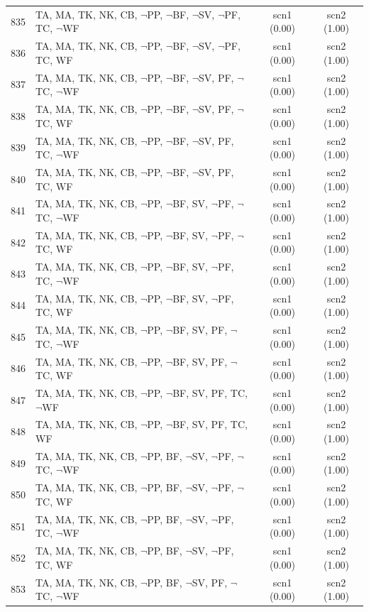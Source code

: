 \documentclass[12pt]{article}
\begin{document}
\begin{longtable}{|l|l|c|c|}
835 & TA, MA, TK, NK, CB, $\neg$PP, $\neg$BF, $\neg$SV, $\neg$PF, TC, $\neg$WF & scn1 (0.00) & scn2 (1.00)\\
836 & TA, MA, TK, NK, CB, $\neg$PP, $\neg$BF, $\neg$SV, $\neg$PF, TC, WF & scn1 (0.00) & scn2 (1.00)\\
837 & TA, MA, TK, NK, CB, $\neg$PP, $\neg$BF, $\neg$SV, PF, $\neg$TC, $\neg$WF & scn1 (0.00) & scn2 (1.00)\\
838 & TA, MA, TK, NK, CB, $\neg$PP, $\neg$BF, $\neg$SV, PF, $\neg$TC, WF & scn1 (0.00) & scn2 (1.00)\\
839 & TA, MA, TK, NK, CB, $\neg$PP, $\neg$BF, $\neg$SV, PF, TC, $\neg$WF & scn1 (0.00) & scn2 (1.00)\\
840 & TA, MA, TK, NK, CB, $\neg$PP, $\neg$BF, $\neg$SV, PF, TC, WF & scn1 (0.00) & scn2 (1.00)\\
841 & TA, MA, TK, NK, CB, $\neg$PP, $\neg$BF, SV, $\neg$PF, $\neg$TC, $\neg$WF & scn1 (0.00) & scn2 (1.00)\\
842 & TA, MA, TK, NK, CB, $\neg$PP, $\neg$BF, SV, $\neg$PF, $\neg$TC, WF & scn1 (0.00) & scn2 (1.00)\\
843 & TA, MA, TK, NK, CB, $\neg$PP, $\neg$BF, SV, $\neg$PF, TC, $\neg$WF & scn1 (0.00) & scn2 (1.00)\\
844 & TA, MA, TK, NK, CB, $\neg$PP, $\neg$BF, SV, $\neg$PF, TC, WF & scn1 (0.00) & scn2 (1.00)\\
845 & TA, MA, TK, NK, CB, $\neg$PP, $\neg$BF, SV, PF, $\neg$TC, $\neg$WF & scn1 (0.00) & scn2 (1.00)\\
846 & TA, MA, TK, NK, CB, $\neg$PP, $\neg$BF, SV, PF, $\neg$TC, WF & scn1 (0.00) & scn2 (1.00)\\
847 & TA, MA, TK, NK, CB, $\neg$PP, $\neg$BF, SV, PF, TC, $\neg$WF & scn1 (0.00) & scn2 (1.00)\\
848 & TA, MA, TK, NK, CB, $\neg$PP, $\neg$BF, SV, PF, TC, WF & scn1 (0.00) & scn2 (1.00)\\
849 & TA, MA, TK, NK, CB, $\neg$PP, BF, $\neg$SV, $\neg$PF, $\neg$TC, $\neg$WF & scn1 (0.00) & scn2 (1.00)\\
850 & TA, MA, TK, NK, CB, $\neg$PP, BF, $\neg$SV, $\neg$PF, $\neg$TC, WF & scn1 (0.00) & scn2 (1.00)\\
851 & TA, MA, TK, NK, CB, $\neg$PP, BF, $\neg$SV, $\neg$PF, TC, $\neg$WF & scn1 (0.00) & scn2 (1.00)\\
852 & TA, MA, TK, NK, CB, $\neg$PP, BF, $\neg$SV, $\neg$PF, TC, WF & scn1 (0.00) & scn2 (1.00)\\
853 & TA, MA, TK, NK, CB, $\neg$PP, BF, $\neg$SV, PF, $\neg$TC, $\neg$WF & scn1 (0.00) & scn2 (1.00)\\

\end{longtable}
\end{document}
